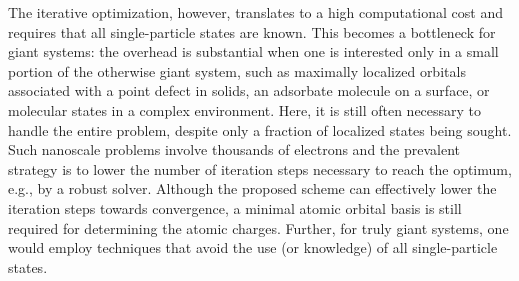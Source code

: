 \documentclass[journal=jacsat,manuscript=article]{achemso}
\begin{document}
The iterative optimization, however, translates to a high computational cost \cite{Pipek1989} and requires that all single-particle states are known. This becomes a bottleneck for giant systems: the overhead is substantial when one is interested only in a small portion of the otherwise giant system, such as maximally localized orbitals associated with a point defect in solids, an adsorbate molecule on a surface, or molecular states in a complex environment. Here, it is still often necessary to handle the entire problem, despite only a fraction of localized states being sought. Such nanoscale problems involve thousands of electrons and the prevalent strategy is to lower the number of iteration steps necessary to reach the optimum, e.g., by a robust solver\cite{Clement2021}. Although the proposed scheme can effectively lower the iteration steps towards convergence, a minimal atomic orbital basis is still required for determining the atomic charges. Further, for truly giant systems, one would employ techniques that avoid the use (or knowledge) of all single-particle states\cite{Baer2013,Cytter2018,Chen2019,Fabian2019,Nguyen2021,Baer2022,Neuhauser2013_RPA,romanova2022stochastic,Neuhauser2013_MP2,Ge2014,Neuhauser2017,Dou2019,Takeshita2019,neuhauser2014breaking,vlcek2017stochastic,Vlcek2018swift,romanova2020decomposition,vlcek2019stochastic}. 
\end{document}
